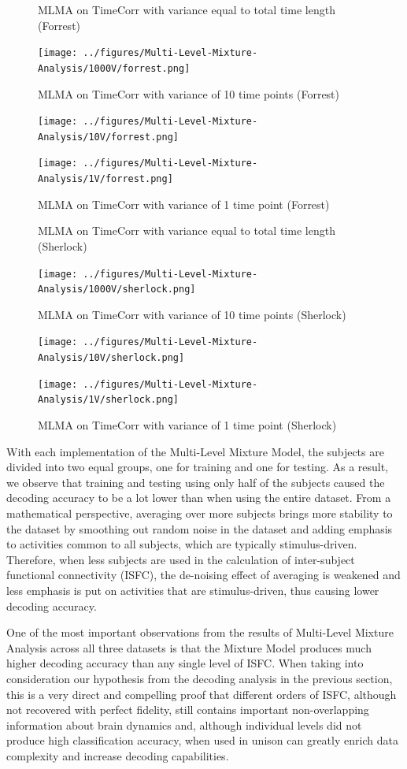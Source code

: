 \documentclass[11pt]{article}
\begin{document}
\begin{enumerate}
\begin{figure}[!htb]
\caption{MLMA on TimeCorr with variance equal to total time length (Forrest)}
\centering
\texttt{[image: ../figures/Multi-Level-Mixture-Analysis/1000V/forrest.png]}
\label{fig:forrestMM1000}
\caption{MLMA on TimeCorr with variance of 10 time points (Forrest)}
\centering
\texttt{[image: ../figures/Multi-Level-Mixture-Analysis/10V/forrest.png]}
\label{fig:forrestMM10}
\caption{MLMA on TimeCorr with variance of 1 time point (Forrest)}
\centering
\texttt{[image: ../figures/Multi-Level-Mixture-Analysis/1V/forrest.png]}
\label{fig:forrestMM1}
\end{figure}


\begin{figure}[!htb]
\caption{MLMA on TimeCorr with variance equal to total time length (Sherlock)}
\centering
\texttt{[image: ../figures/Multi-Level-Mixture-Analysis/1000V/sherlock.png]}
\label{fig:sherlockMM1000}
\caption{MLMA on TimeCorr with variance of 10 time points (Sherlock)}
\centering
\texttt{[image: ../figures/Multi-Level-Mixture-Analysis/10V/sherlock.png]}
\label{fig:sherlockMM10}
\caption{MLMA on TimeCorr with variance of 1 time point (Sherlock)}
\centering
\texttt{[image: ../figures/Multi-Level-Mixture-Analysis/1V/sherlock.png]}
\label{fig:sherlockMM1}
\end{figure}

With each implementation of the Multi-Level Mixture Model, the subjects are divided into two equal groups, one for training and one for testing. As a result, we observe that training and testing using only half of the subjects caused the decoding accuracy to be a lot lower than when using the entire dataset. From a mathematical perspective, averaging over more subjects brings more stability to the dataset by smoothing out random noise in the dataset and adding emphasis to activities common to all subjects, which are typically stimulus-driven. Therefore, when less subjects are used in the calculation of inter-subject functional connectivity (ISFC), the de-noising effect of averaging is weakened and less emphasis is put on activities that are stimulus-driven, thus causing lower decoding accuracy.

One of the most important observations from the results of Multi-Level Mixture Analysis across all three datasets is that the Mixture Model produces much higher decoding accuracy than any single level of ISFC. When taking into consideration our hypothesis from the decoding analysis in the previous section, this is a very direct and compelling proof that different orders of ISFC, although not recovered with perfect fidelity, still contains important non-overlapping information about brain dynamics and, although individual levels did not produce high classification accuracy, when used in unison can greatly enrich data complexity and increase decoding capabilities.


\end{enumerate}
\end{document}
